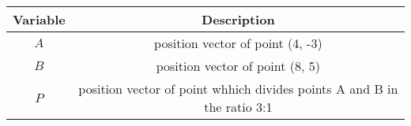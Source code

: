 \begin{tabular}[12pt]{ |c| c|}
    \hline
    \textbf{Variable} & \textbf{Description}\\ 
    \hline
    $A$ & position vector of point (4, -3) \\
    \hline 
    $B$ & position vector of point (8, 5)\\
    \hline
    $P$ & position vector of point whhich divides points A and B in the ratio 3:1\\
    \hline   
    \end{tabular}

